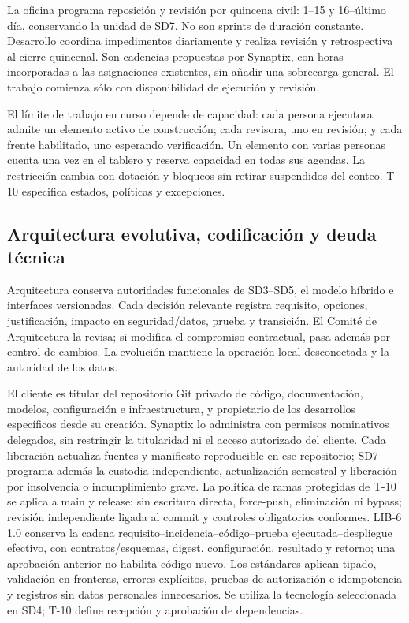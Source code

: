 La oficina programa reposición y revisión por quincena civil: 1--15 y 16--último día, conservando la unidad de SD7. No son sprints de duración constante. Desarrollo coordina impedimentos diariamente y realiza revisión y retrospectiva al cierre quincenal. Son cadencias propuestas por Synaptix, con horas incorporadas a las asignaciones existentes, sin añadir una sobrecarga general. El trabajo comienza sólo con disponibilidad de ejecución y revisión.

El límite de trabajo en curso depende de capacidad: cada persona ejecutora admite un elemento activo de construcción; cada revisora, uno en revisión; y cada frente habilitado, uno esperando verificación. Un elemento con varias personas cuenta una vez en el tablero y reserva capacidad en todas sus agendas. La restricción cambia con dotación y bloqueos sin retirar suspendidos del conteo. T-10 especifica estados, políticas y excepciones.

\subsection{Arquitectura evolutiva, codificación y deuda técnica}
Arquitectura conserva autoridades funcionales de SD3--SD5, el modelo híbrido e interfaces versionadas. Cada decisión relevante registra requisito, opciones, justificación, impacto en seguridad/datos, prueba y transición. El Comité de Arquitectura la revisa; si modifica el compromiso contractual, pasa además por control de cambios. La evolución mantiene la operación local desconectada y la autoridad de los datos.

El cliente es titular del repositorio Git privado de código, documentación, modelos, configuración e infraestructura, y propietario de los desarrollos específicos desde su creación. Synaptix lo administra con permisos nominativos delegados, sin restringir la titularidad ni el acceso autorizado del cliente. Cada liberación actualiza fuentes y manifiesto reproducible en ese repositorio; SD7 programa además la custodia independiente, actualización semestral y liberación por insolvencia o incumplimiento grave. La política de ramas protegidas de T-10 se aplica a main y release: sin escritura directa, force-push, eliminación ni bypass; revisión independiente ligada al commit y controles obligatorios conformes. LIB-6 1.0 conserva la cadena requisito--incidencia--código--prueba ejecutada--despliegue efectivo, con contratos/esquemas, digest, configuración, resultado y retorno; una aprobación anterior no habilita código nuevo. Los estándares aplican tipado, validación en fronteras, errores explícitos, pruebas de autorización e idempotencia y registros sin datos personales innecesarios. Se utiliza la tecnología seleccionada en SD4; T-10 define recepción y aprobación de dependencias. \parencites[art.~84.1/6, p.~43]{sd6-ba}[RT-04.03/04, p.~10; RT-11.26, p.~24]{sd6-bt}[PS.1; PW.4--PW.8, tabla~1]{sd6-ssdf}

